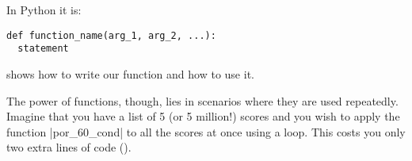 In Python it is:

\begin{verbatim}
def function_name(arg_1, arg_2, ...):
  statement
\end{verbatim}

 shows how to write our function and how to use it.

The power of functions, though, lies in scenarios where they are used
repeatedly.  Imagine that you have a list of 5 (or 5 million!) scores
and you wish to apply the function |por_60_cond| to all the scores at
once using a loop. This costs you only two extra lines of code
().













